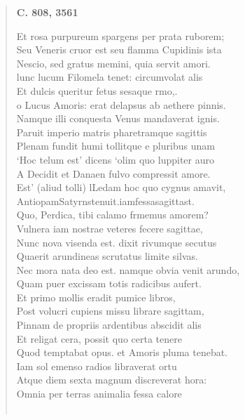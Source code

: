 \documentclass[11pt, a4paper]{report}
\begin{document}
\begin{verse}
     \marginpar{[287]} \begin{center} \textbf{C. 808, 3561} \end{center}Et rosa purpureum spargens per prata ruborem; \\ Seu Veneris cruor est seu flamma Cupidinis ista \\ Nescio, sed gratus memini, quia servit amori. \\ lunc lucum Filomela tenet: circumvolat alis \\ Et dulcis queritur fetus sesaque rmo,. \\ o Lucus Amoris: erat delapsus ab aethere pinnis. \\ Namque illi conquesta Venus mandaverat ignis. \\ Paruit imperio matris pharetramque sagittis \\ Plenam fundit humi tollitque e pluribus unam \\ ‘Hoc telum est’ dicens ‘olim quo luppiter auro \\ A Decidit et Danaen fulvo compressit amore. \\ Est’ (aliud tolli) lLedam hoc quo cygnus amavit, \\ AntiopamSatyrnstenuit.iamfessasagittast. \\ Quo, Perdica, tibi calamo frmemus amorem? \\ Vulnera iam nostrae veteres fecere sagittae, \\ Nunc nova visenda est. dixit rivumque secutus \\ Quaerit arundineas scrutatus limite silvas. \\ Nec mora nata deo est. namque obvia venit arundo, \\ Quam puer excissam totis radicibus aufert. \\ Et primo mollis eradit pumice libros, \\ Post volucri cupiens missu librare sagittam, \\ Pinnam de propriis ardentibus abscidit alis \\ Et religat cera, possit quo certa tenere \\ Quod temptabat opus. et Amoris pluma tenebat. \\ Iam sol emenso radios libraverat ortu \\ Atque diem sexta magnum discreverat hora: \\ Omnia per terras animalia fessa calore \\ 
        ﻿\pagebreak 

\end{verse}
\end{document}
